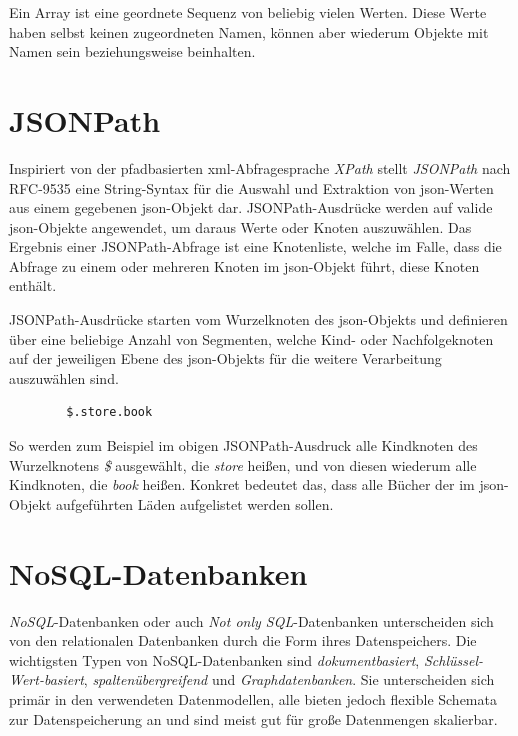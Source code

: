 \documentclass[oneside]{ausarbeitung}
\begin{document}
	Ein Array ist eine geordnete Sequenz von beliebig vielen Werten. Diese Werte haben selbst keinen zugeordneten Namen, können aber wiederum Objekte mit Namen sein beziehungsweise beinhalten.  
	
	
	\section{JSONPath}
	
	Inspiriert von der pfadbasierten \ac{xml}-Abfragesprache \textit{XPath} stellt \textit{JSONPath} nach RFC-9535 eine String-Syntax für die Auswahl und Extraktion von \ac{json}-Werten aus einem gegebenen \ac{json}-Objekt dar. JSONPath-Ausdrücke werden auf valide \ac{json}-Objekte angewendet, um daraus Werte oder Knoten auszuwählen. Das Ergebnis einer JSONPath-Abfrage ist eine Knotenliste, welche im Falle, dass die Abfrage zu einem oder mehreren Knoten im \ac{json}-Objekt führt, diese Knoten enthält.
	
	JSONPath-Ausdrücke starten vom Wurzelknoten des \ac{json}-Objekts und definieren über eine beliebige Anzahl von Segmenten, welche Kind- oder Nachfolgeknoten auf der jeweiligen Ebene des \ac{json}-Objekts für die weitere Verarbeitung auszuwählen sind.
	
	\begin{lstlisting}
		$.store.book
	\end{lstlisting}
	
	So werden zum Beispiel im obigen JSONPath-Ausdruck alle Kindknoten des Wurzelknotens \textit{\$} ausgewählt, die \textit{store} heißen, und von diesen wiederum alle Kindknoten, die \textit{book} heißen. Konkret bedeutet das, dass alle Bücher der im \ac{json}-Objekt aufgeführten Läden aufgelistet werden sollen.
	
	
	
	
	\section{NoSQL-Datenbanken}
	
	\textit{NoSQL}-Datenbanken oder auch \textit{Not only SQL}-Datenbanken unterscheiden sich von den relationalen Datenbanken durch die Form ihres Datenspeichers. Die wichtigsten Typen von NoSQL-Datenbanken sind \textit{dokumentbasiert}, \textit{Schlüssel-Wert-basiert}, \textit{spaltenübergreifend} und \textit{Graphdatenbanken}. Sie unterscheiden sich primär in den verwendeten Datenmodellen, alle bieten jedoch flexible Schemata zur Datenspeicherung an und sind meist gut für große Datenmengen skalierbar.
	
\end{document}
